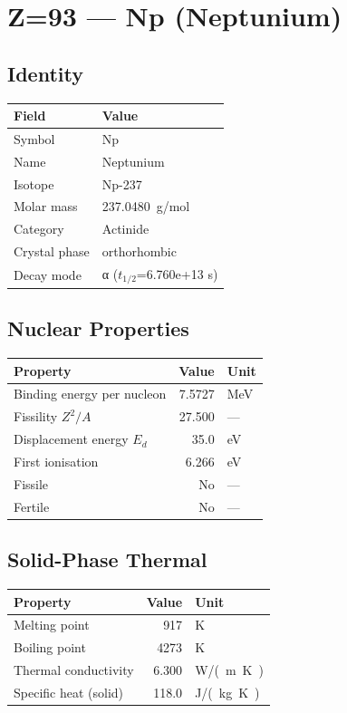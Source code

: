 \documentclass[11pt,a4paper]{article}
\begin{document}
\newpage

\section{Z=93 --- Np (Neptunium)}
\label{sec:Z93}

\subsection{Identity}
\begin{tabular}{ll}
  \toprule
  Field & Value \\
  \midrule
  Symbol & Np \\
  Name & Neptunium \\
  Isotope & Np-237 \\
  Molar mass & \SI{237.0480}{g/mol} \\
  Category & Actinide \\
  Crystal phase & orthorhombic \\
  Decay mode & α ($t_{1/2}$=6.760e+13 s) \\
  \bottomrule
\end{tabular}

\subsection{Nuclear Properties}
\begin{tabular}{lrl}
  \toprule
  Property & Value & Unit \\
  \midrule
  Binding energy per nucleon & 7.5727 & \si{MeV} \\
  Fissility $Z^2/A$ & 27.500 & --- \\
  Displacement energy $E_d$ & 35.0 & \si{eV} \\
  First ionisation & 6.266 & \si{eV} \\
  Fissile & No & --- \\
  Fertile & No & --- \\
  \bottomrule
\end{tabular}

\subsection{Solid-Phase Thermal}
\begin{tabular}{lrl}
  \toprule
  Property & Value & Unit \\
  \midrule
  Melting point & 917 & \si{K} \\
  Boiling point & 4273 & \si{K} \\
  Thermal conductivity & 6.300 & \si{W/(m.K)} \\
  Specific heat (solid) & 118.0 & \si{J/(kg.K)} \\
  \bottomrule
\end{tabular}
\end{document}
